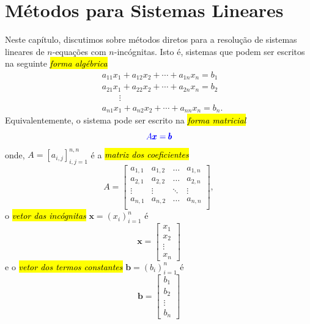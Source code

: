 
\chapter{Métodos para Sistemas Lineares}\label{cap_sislin}
\thispagestyle{fancy}

Neste capítulo, discutimos sobre métodos diretos para a resolução de sistemas lineares de $n$-equações com $n$-incógnitas. Isto é, sistemas que podem ser escritos na seguinte \hl{\emph{forma algébrica}}
\begin{subequations}
  \begin{align}
    &a_{11}x_1 + a_{12}x_2 + \cdots + a_{1n}x_n = b_1\\
    &a_{21}x_1 + a_{22}x_2 + \cdots + a_{2n}x_n = b_2\\
    &\quad\quad\vdots \\
    &a_{n1}x_1 + a_{n2}x_2 + \cdots + a_{nn}x_n = b_n.
  \end{align}
\end{subequations}
Equivalentemente, o sistema pode ser escrito na \hl{\emph{forma matricial}}
\begin{equation}\color{blue}A\pmb{x} = \pmb{b}
\end{equation}
onde, $A = [a_{i,j}]_{i,j=1}^{n,n}$ é a \hl{\emph{matriz dos coeficientes}}
\begin{equation}
  A =
  \begin{bmatrix}
    a_{1,1} & a_{1,2} & \ldots & a_{1,n}\\
    a_{2,1} & a_{2,2} & \ldots & a_{2,n}\\
    \vdots & \vdots & \ddots & \vdots\\
    a_{n,1} & a_{n,2} & \ldots & a_{n,n}\\
  \end{bmatrix},
\end{equation}
o \hl{\emph{vetor das incógnitas}} $\pmb{x} = (x_i)_{i=1}^n$ é
\begin{equation}
  \pmb{x} =
  \begin{bmatrix}
    x_1\\
    x_2\\
    \vdots\\
    x_n
  \end{bmatrix}
\end{equation}
e o \hl{\emph{vetor dos termos constantes}} $\pmb{b} = (b_i)_{i=1}^n$ é
\begin{equation}
  \pmb{b} =
  \begin{bmatrix}
    b_1\\
    b_2\\
    \vdots\\
    b_n
  \end{bmatrix}
\end{equation}

